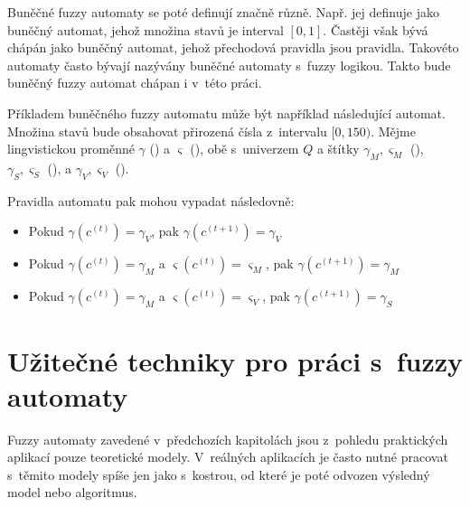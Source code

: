 Buněčné fuzzy automaty se poté definují značně různě. Např. \cite{For-FuzCelAutConjNormForm, MraZimLapBaj-FuzCelAut+} jej definuje jako buněčný automat, jehož množina stavů je interval $[0,1]$. Častěji však bývá chápán jako buněčný automat, jehož přechodová pravidla jsou \ifthen pravidla. Takovéto automaty často bývají nazývány buněčné automaty s~fuzzy logikou. Takto bude buněčný fuzzy automat chápan i v~této práci.


\begin{example}
 Příkladem buněčného fuzzy automatu může být například následující automat. Množina stavů bude obsahovat přirozená čísla z~intervalu $[0, 150)$. Mějme lingvistickou proměnné $\gamma$ () a $\varsigma$ (), obě s~univerzem $Q$ a štítky $\gamma_M, \varsigma_M$ (), $\gamma_S, \varsigma_S$ (), a $\gamma_V, \varsigma_V$ (). 

 Pravidla automatu pak mohou vypadat následovně:
 \begin{itemize}
  \item Pokud $\gamma(c^{(t)}) = \gamma_V$, 						pak $\gamma(c^{(t+1)}) = \gamma_V$
  \item Pokud $\gamma(c^{(t)}) = \gamma_M$ a $\varsigma(c^{(t)}) = \varsigma_M$, 	pak $\gamma(c^{(t+1)}) = \gamma_M$
  \item Pokud $\gamma(c^{(t)}) = \gamma_M$ a $\varsigma(c^{(t)}) = \varsigma_V$, 	pak $\gamma(c^{(t+1)}) = \gamma_S$
 \end{itemize}
\end{example}




\section{Užitečné techniky pro práci s~fuzzy automaty}

Fuzzy automaty zavedené v~předchozích kapitolách jsou z~pohledu praktických aplikací pouze teoretické modely. V~reálných aplikacích je často nutné pracovat s~těmito modely spíše jen jako s~kostrou, od které je poté odvozen výsledný model nebo algoritmus.

